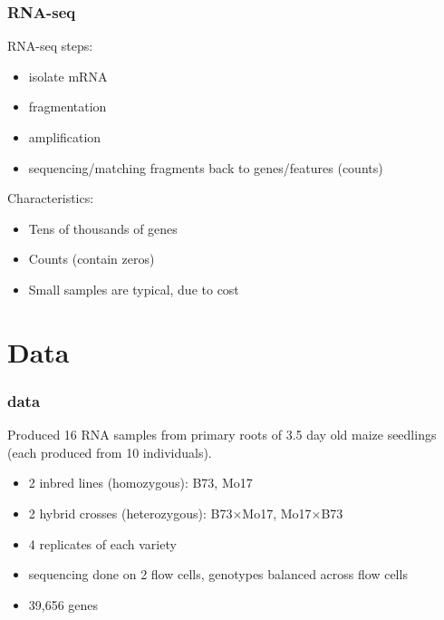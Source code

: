 \documentclass{beamer}
\begin{document}
\begin{frame}%
\frametitle{RNA-seq}
  \footnotesize
  RNA-seq steps:
  \begin{itemize}
    \item isolate mRNA
    \item fragmentation
    \item amplification
    \item sequencing/matching fragments back to genes/features (counts)
  \end{itemize}
  \vspace{.5cm}
  \pause Characteristics:
  \begin{itemize}
    \item Tens of thousands of genes
    \item Counts (contain zeros)
    \item Small samples are typical, due to cost
  \end{itemize}
\end{frame}

\section{Data}
\begin{frame}%
\small
  \frametitle{\citet{paschold} data}
  Produced 16 RNA samples from primary roots of 3.5 day old maize seedlings (each produced from 10 individuals).
  
  \vspace{.5cm}
  \begin{beamerboxesrounded}[upper=upcol,lower=lowcol,shadow=true]{}
  \begin{itemize}
    \item 2 inbred lines (homozygous): B73, Mo17
    \item 2 hybrid crosses (heterozygous): B73$\times$Mo17, Mo17$\times$B73
    \item 4 replicates of each variety
    \item sequencing done on 2 flow cells, genotypes balanced across flow cells
    \item 39,656 genes
  \end{itemize}
  \end{beamerboxesrounded}
\end{frame}
\end{document}
